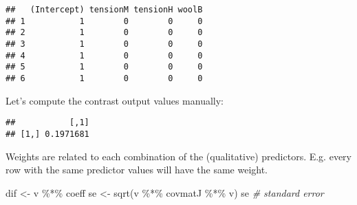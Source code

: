\documentclass[
  oneside]{book}
\newenvironment{Shaded}{\begin{snugshade}}{\end{snugshade}}
\newcommand{\CommentTok}[1]{\textcolor[rgb]{0.56,0.35,0.01}{\textit{#1}}}
\newcommand{\DecValTok}[1]{\textcolor[rgb]{0.00,0.00,0.81}{#1}}
\newcommand{\FunctionTok}[1]{\textcolor[rgb]{0.00,0.00,0.00}{#1}}
\newcommand{\NormalTok}[1]{#1}
\newcommand{\OtherTok}[1]{\textcolor[rgb]{0.56,0.35,0.01}{#1}}
\newcommand{\SpecialCharTok}[1]{\textcolor[rgb]{0.00,0.00,0.00}{#1}}
\begin{document}
\begin{verbatim}
##   (Intercept) tensionM tensionH woolB
## 1           1        0        0     0
## 2           1        0        0     0
## 3           1        0        0     0
## 4           1        0        0     0
## 5           1        0        0     0
## 6           1        0        0     0
\end{verbatim}

Let's compute the contrast output values manually:

\begin{Shaded}
\end{Shaded}

\begin{verbatim}
##           [,1]
## [1,] 0.1971681
\end{verbatim}

\begin{Shaded}
\end{Shaded}

Weights are related to each combination of the (qualitative)
predictors. E.g. every row with the same predictor values will have
the same weight.

\begin{Shaded}
\begin{Highlighting}[]
\NormalTok{dif }\OtherTok{\textless{}{-}}\NormalTok{ v }\SpecialCharTok{\%*\%}\NormalTok{ coeff}
\NormalTok{se }\OtherTok{\textless{}{-}} \FunctionTok{sqrt}\NormalTok{(v }\SpecialCharTok{\%*\%}\NormalTok{ covmatJ }\SpecialCharTok{\%*\%}\NormalTok{ v)}
\NormalTok{se }\CommentTok{\# standard error}
\end{Highlighting}
\end{Shaded}
\end{document}
